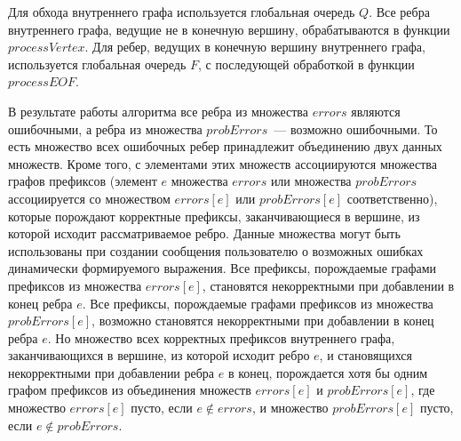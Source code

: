 Для обхода внутреннего графа используется глобальная очередь $Q$. Все ребра внутреннего графа, ведущие не в конечную вершину, обрабатываются в функции $processVertex$. Для ребер, ведущих в конечную вершину внутреннего графа, используется глобальная очередь $F$, с последующей обработкой в функции $processEOF$.

В результате работы алгоритма все ребра из множества $errors$ являются ошибочными, а ребра из множества $probErrors$~--- возможно ошибочными. То есть множество всех ошибочных ребер принадлежит объединению двух данных множеств. Кроме того, с элементами этих множеств ассоциируются множества графов префиксов (элемент $e$ множества $errors$ или множества $probErrors$ ассоциируется со множеством $errors[e]$ или $probErrors[e]$ соответственно), которые порождают корректные префиксы, заканчивающиеся в вершине, из которой исходит рассматриваемое ребро. Данные множества могут быть использованы при создании сообщения пользователю о возможных ошибках динамически формируемого выражения. Все префиксы, порождаемые графами префиксов из множества $errors[e]$, становятся некорректными при добавлении в конец ребра $e$. Все префиксы, порождаемые графами префиксов из множества $probErrors[e]$, возможно становятся некорректными при добавлении в конец ребра $e$. Но множество всех корректных префиксов внутреннего графа, заканчивающихся в вершине, из которой исходит ребро $e$, и становящихся некорректными при добавлении ребра $e$ в конец, порождается хотя бы одним графом префиксов из объединения множеств $errors[e]$ и $probErrors[e]$, где множество $errors[e]$ пусто, если $e \notin errors$, и множество $probErrors[e]$ пусто, если $e \notin probErrors$.
